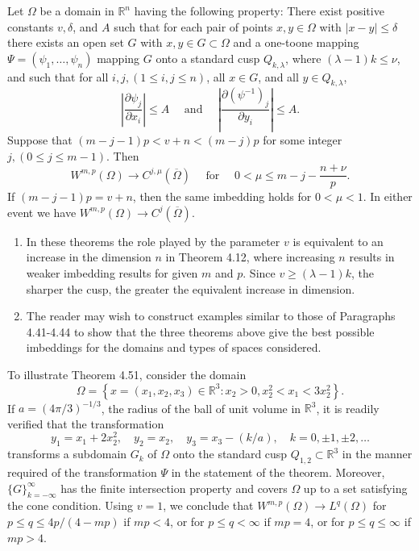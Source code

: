 \begin{theorem}
  Let $\Omega$ be a domain in $\mathbb{R}^n$ having the following property:
  There exist positive constants $v, \delta$, and $A$ such that for each pair of points $x, y \in \Omega$
  with $|x-y| \leq \delta$ there exists an open set $G$ with $x, y \in G \subset \Omega$ and a one-toone mapping 
  $\Psi=\left(\psi_1, \ldots, \psi_n\right)$ mapping $G$ onto a standard cusp $Q_{k, \lambda}$,
  where $(\lambda-1) k \leq \nu$, and such that for all $i, j,(1 \leq i, j \leq n)$, all $x \in G$,
  and all $y \in Q_{k, \lambda}$,
  \[
  \left|\frac{\partial \psi_j}{\partial x_i}\right| \leq A \quad \text { and } \quad\left|\frac{\partial\left(\psi^{-1}\right)_j}{\partial y_i}\right| \leq A .
  \]
  Suppose that $(m-j-1) p<v+n<(m-j) p$ for some integer $j,(0 \leq j \leq m-1)$. Then
  \[
  W^{m, p}(\Omega) \rightarrow C^{j, \mu}(\overline{\Omega}) \quad \text { for } \quad 0<\mu \leq m-j-\frac{n+\nu}{p} .
  \]
  If $(m-j-1) p=v+n$, then the same imbedding holds for $0<\mu<1$. In either event we have $W^{m,p}(\Omega) \rightarrow C^j(\overline{\Omega})$.
\end{theorem}


\begin{remarks}
  \begin{enumerate}
    \item In these theorems the role played by the parameter $v$ is equivalent to an increase
      in the dimension $n$ in Theorem 4.12, where increasing $n$ results in weaker imbedding results for
      given $m$ and $p$. Since $v \geq(\lambda-1) k$, the sharper the cusp, the greater the equivalent increase 
      in dimension.
    \item The reader may wish to construct examples similar to those of Paragraphs 4.41-4.44 to show that the 
      three theorems above give the best possible imbeddings for the domains and types of spaces considered.
  \end{enumerate}
\end{remarks}


\begin{example}
  To illustrate Theorem 4.51, consider the domain
  \[
  \Omega=\left\{x=\left(x_1, x_2, x_3\right) \in \mathbb{R}^3: x_2>0, x_2^2<x_1<3 x_2^2\right\} .
  \]
  If $a=(4 \pi / 3)^{-1 / 3}$, the radius of the ball of unit volume in $\mathbb{R}^3$, it is readily verified
  that the transformation
  \[
  y_1=x_1+2 x_2^2, \quad y_2=x_2, \quad y_3=x_3-(k / a), \quad k=0, \pm 1, \pm 2, \ldots
  \]
  transforms a subdomain $G_k$ of $\Omega$ onto the standard cusp $Q_{1,2} \subset \mathbb{R}^3$ in the manner 
  required of the transformation $\Psi$ in the statement of the theorem. Moreover, $\{G\}_{k=-\infty}^{\infty}$ 
  has the finite intersection property and covers $\Omega$ up to a set satisfying the cone condition.
  Using $v=1$, we conclude that $W^{m,p}(\Omega) \rightarrow L^q(\Omega)$ for $p \leq q \leq 4 p /(4-m p)$
  if $m p<4$, or for $p \leq q<\infty$ if $m p=4$, or for $p \leq q \leq \infty$ if $m p>4$.
\end{example}


